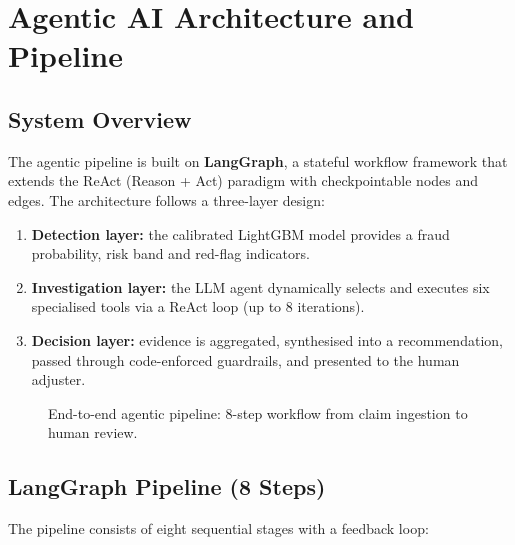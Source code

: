 \documentclass[12pt,a4paper]{article}
\begin{document}
\section{Agentic AI Architecture and Pipeline}
\label{ch:agent}

\subsection{System Overview}

The agentic pipeline is built on \textbf{LangGraph}, a stateful workflow framework that extends the ReAct (Reason + Act) paradigm with checkpointable nodes and edges.  The architecture follows a three-layer design:

\begin{enumerate}
    \item \textbf{Detection layer:} the calibrated LightGBM model provides a fraud probability, risk band and red-flag indicators.
    \item \textbf{Investigation layer:} the LLM agent dynamically selects and executes six specialised tools via a ReAct loop (up to 8 iterations).
    \item \textbf{Decision layer:} evidence is aggregated, synthesised into a recommendation, passed through code-enforced guardrails, and presented to the human adjuster.
\end{enumerate}

\begin{figure}[H]
\centering
{}
\caption{End-to-end agentic pipeline: 8-step workflow from claim ingestion to human review.}
\label{fig:pipeline}
\end{figure}

\subsection{LangGraph Pipeline (8 Steps)}

The pipeline consists of eight sequential stages with a feedback loop:
\end{document}
